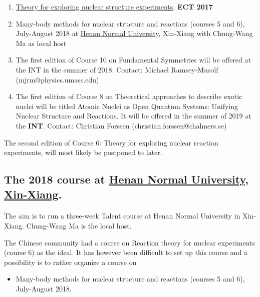 \documentclass[%
oneside,                 %
final,                   %
10pt]{article}
\begin{document}
\begin{enumerate}
\item \href{{https://github.com/NuclearTalent/NuclearStructure}}{Theory for exploring nuclear structure experiments}, \textbf{ECT 2017}

\item Many-body methods for nuclear structure and reactions (courses 5 and 6), July-August 2018 at \href{{http://www.htu.cn/english/}}{Henan Normal University}, Xin-Xiang with Chung-Wang Ma as local host

\item The first edition of Course 10 on Fundamental Symmetries will be offered at the INT in the summer of 2018. Contact: Michael Ramsey-Musolf (mjrm@physics.umass.edu)

\item The first edition of Course 8 on Theoretical approaches to describe exotic nuclei will be titled Atomic Nuclei as Open Quantum Systems: Unifying Nuclear Structure and Reactions. It will be offered in the summer of 2019 at the \textbf{INT}. Contact: Christian Forssen (christian.forssen@chalmers.se)
\end{enumerate}

\noindent
The second edition of Course 6: Theory for exploring nuclear reaction experiments, will most likely be postponed to later.





\subsection*{The 2018 course at \href{{http://www.htu.cn/english/}}{Henan Normal University, Xin-Xiang}.}

\paragraph{}
The aim is to run a three-week Talent course at Henan Normal University in Xin-Xiang. Chung-Wang Ma is the local host. 

The Chinese community had a course on Reaction theory for nuclear experiments (course 6) as the ideal. It has however been difficult to set up this course and a possibility is to rather organize a course on

\begin{itemize}
\item Many-body methods for nuclear structure and reactions (courses 5 and 6), July-August 2018.
\end{itemize}
\end{document}
